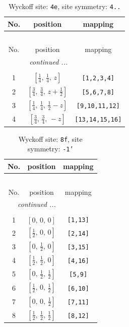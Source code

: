\documentclass[fleqn,8pt]{jsarticle}
\begin{document}
\renewcommand{\arraystretch}{1.2}
\begin{longtable}{ccc}
\caption{Wyckoff site: {\tt 4e}, site symmetry: {\tt 4..}}
 \\
 \hline \hline
No. & position & mapping \\ \hline \endfirsthead

\multicolumn{2}{l}{\tablename\ \thetable{}} \\
 \hline \hline
No. & position & mapping \\ \hline \endhead

 \hline \hline
\multicolumn{2}{r}{\footnotesize\it continued ...} \\ \endfoot

 \hline \hline
\multicolumn{2}{r}{} \\ \endlastfoot

1 & $\left[ \frac{1}{4},\, \frac{1}{4},\, z \right]$ & {\tt [1,2,3,4]} \\ \hline
2 & $\left[ \frac{3}{4},\, \frac{3}{4},\, z + \frac{1}{2} \right]$ & {\tt [5,6,7,8]} \\ \hline
3 & $\left[ \frac{1}{4},\, \frac{1}{4},\, \frac{1}{2} - z \right]$ & {\tt [9,10,11,12]} \\ \hline
4 & $\left[ \frac{3}{4},\, \frac{3}{4},\, - z \right]$ & {\tt [13,14,15,16]} \\
\end{longtable}
\renewcommand{\arraystretch}{1.2}
\begin{longtable}{ccc}
\caption{Wyckoff site: {\tt 8f}, site symmetry: {\tt -1'}}
 \\
 \hline \hline
No. & position & mapping \\ \hline \endfirsthead

\multicolumn{2}{l}{\tablename\ \thetable{}} \\
 \hline \hline
No. & position & mapping \\ \hline \endhead

 \hline \hline
\multicolumn{2}{r}{\footnotesize\it continued ...} \\ \endfoot

 \hline \hline
\multicolumn{2}{r}{} \\ \endlastfoot

1 & $\left[ 0,\, 0,\, 0 \right]$ & {\tt [1,13]} \\ \hline
2 & $\left[ \frac{1}{2},\, 0,\, 0 \right]$ & {\tt [2,14]} \\ \hline
3 & $\left[ 0,\, \frac{1}{2},\, 0 \right]$ & {\tt [3,15]} \\ \hline
4 & $\left[ \frac{1}{2},\, \frac{1}{2},\, 0 \right]$ & {\tt [4,16]} \\ \hline
5 & $\left[ 0,\, \frac{1}{2},\, \frac{1}{2} \right]$ & {\tt [5,9]} \\ \hline
6 & $\left[ \frac{1}{2},\, 0,\, \frac{1}{2} \right]$ & {\tt [6,10]} \\ \hline
7 & $\left[ 0,\, 0,\, \frac{1}{2} \right]$ & {\tt [7,11]} \\ \hline
8 & $\left[ \frac{1}{2},\, \frac{1}{2},\, \frac{1}{2} \right]$ & {\tt [8,12]} \\
\end{longtable}
\end{document}
